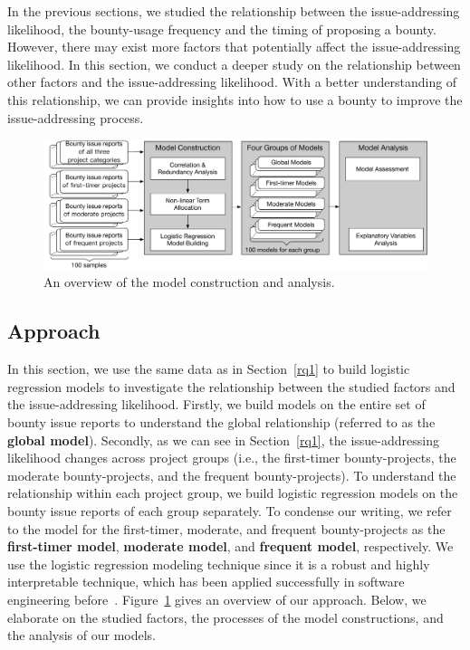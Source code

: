 



In the previous sections, we studied the relationship between the issue-addressing likelihood, the bounty-usage frequency and the timing of proposing a bounty. However, there may exist more factors that potentially affect the issue-addressing likelihood. In this section, we conduct a deeper study on the relationship between other factors and the issue-addressing likelihood.
With a better understanding of this relationship, we can provide insights into how to use a bounty to improve the issue-addressing process.

\begin{figure}[t]
\centering\includegraphics[width=17cm]{pics/rq3/rq3flow}
\vspace{-0.2in}
\caption{An overview of the model construction and analysis.}
\label{fig:rq3_flow}
\vspace{-0.1in}
\end{figure}

\subsection{Approach}
In this section, we use the same data as in Section~\ref{rq1} to build logistic regression models to investigate the relationship between the studied factors and the issue-addressing likelihood.
Firstly, we build models on the entire set of bounty issue reports to understand the global relationship (referred to as the \textbf{global model}). Secondly, as we can see in Section~\ref{rq1}, the issue-addressing likelihood changes across project groups (i.e., the first-timer bounty-projects, the moderate bounty-projects, and the frequent bounty-projects). To understand the relationship within each project group, we build logistic regression models on the bounty issue reports of each group separately. To condense our writing, we refer to the model for the first-timer, moderate, and frequent bounty-projects as the \textbf{first-timer model}, \textbf{moderate model}, and \textbf{frequent model}, respectively.
We use the logistic regression modeling technique since it is a robust and highly interpretable technique, which has been applied successfully in software engineering before~\cite{wang2017understanding,mcintosh2016empirical}.
Figure~\ref{fig:rq3_flow} gives an overview of our approach.
Below, we elaborate on the studied factors, the processes of the model constructions, and the analysis of our models.

